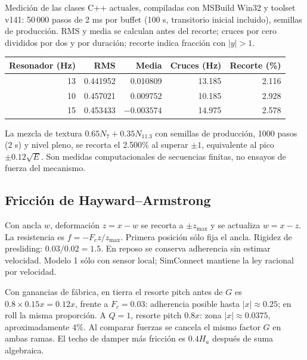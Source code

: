 Medición de las clases C++ actuales, compiladas con MSBuild Win32 y toolset v141: 50\,000 pasos de 2 ms por buffet (100 s, transitorio inicial incluido), semillas de producción. RMS y media se calculan antes del recorte; cruces por cero divididos por dos y por duración; recorte indica fracción con $|y|>1$.
\begin{center}\begin{tabular}{rrrrr}
\toprule Resonador (Hz)&RMS&Media&Cruces (Hz)&Recorte (\%)\\\midrule
13&0.441952&0.010809&13.185&2.116\\
10&0.457021&0.009752&10.185&2.928\\
15&0.453433&$-0.003574$&14.975&2.578\\
\bottomrule\end{tabular}\end{center}
La mezcla de textura $0.65N_7+0.35N_{11.3}$ con semillas de producción, 1000 pasos (2 s) y nivel pleno, se recorta el 2.500\% al superar $\pm1$, equivalente al pico $\pm0.12\sqrt E$. Son medidas computacionales de secuencias finitas, no ensayos de fuerza del mecanismo.


\subsection{Fricción de Hayward--Armstrong}
Con ancla $w$, deformación $z=x-w$ se recorta a $\pm z_{\max}$ y se actualiza $w=x-z$. La resistencia es $f=-F_cz/z_{\max}$. Primera posición sólo fija el ancla. Rigidez de presliding: $0.03/0.02=1.5$. En reposo se conserva adherencia sin estimar velocidad. Modelo 1 sólo con sensor local; SimConnect mantiene la ley racional por velocidad.

Con ganancias de fábrica, en tierra el resorte pitch antes de $G$ es $0.8\times0.15x=0.12x$, frente a $F_c=0.03$: adherencia posible hasta $|x|\approx0.25$; en roll la misma proporción. A $Q=1$, resorte pitch $0.8x$: zona $|x|\approx0.0375$, aproximadamente 4\%. Al comparar fuerzas se cancela el mismo factor $G$ en ambas ramas. El techo de damper más fricción es $0.4H_a$ después de suma algebraica.



